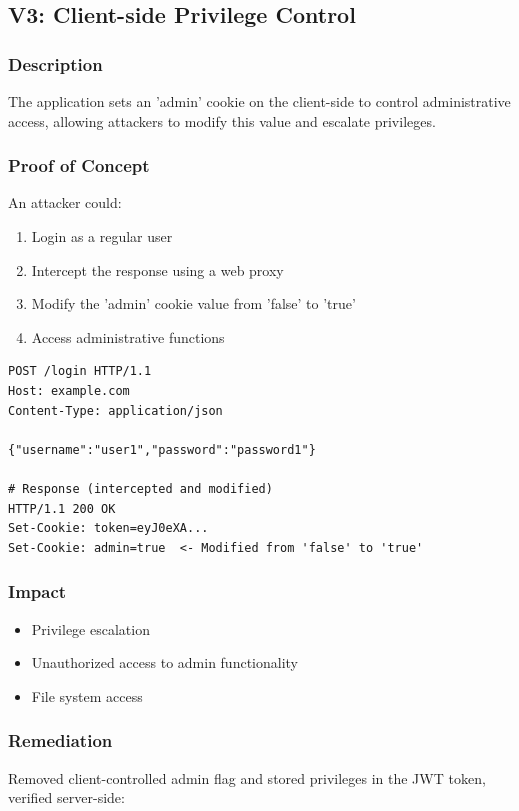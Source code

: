 \documentclass[11pt,a4paper]{article}
\newenvironment{vulnerability}[3]{%
    \begin{tcolorbox}[
        colback=white,
        colframe=#1,
        fonttitle=\bfseries\color{white},
        coltitle=#1,
        title=#2: #3
    ]
}{%
    \end{tcolorbox}
}
\begin{document}
\subsection{V3: Client-side Privilege Control}

\begin{vulnerability}{highcolor}{High}{Client-side Privilege Control}
\subsubsection*{Description}
The application sets an 'admin' cookie on the client-side to control administrative access, allowing attackers to modify this value and escalate privileges.

\subsubsection*{Proof of Concept}
An attacker could:
\begin{enumerate}
    \item Login as a regular user
    \item Intercept the response using a web proxy
    \item Modify the 'admin' cookie value from 'false' to 'true'
    \item Access administrative functions
\end{enumerate}

\begin{lstlisting}[language=http]
POST /login HTTP/1.1
Host: example.com
Content-Type: application/json

{"username":"user1","password":"password1"}

# Response (intercepted and modified)
HTTP/1.1 200 OK
Set-Cookie: token=eyJ0eXA...
Set-Cookie: admin=true  <- Modified from 'false' to 'true'
\end{lstlisting}

\subsubsection*{Impact}
\begin{itemize}
    \item Privilege escalation
    \item Unauthorized access to admin functionality
    \item File system access
\end{itemize}

\subsubsection*{Remediation}
Removed client-controlled admin flag and stored privileges in the JWT token, verified server-side:


\end{vulnerability}
\end{document}
